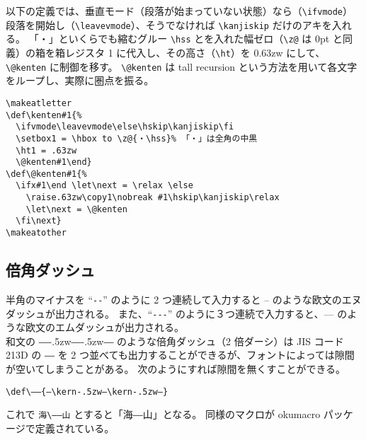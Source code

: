 以下の定義では、垂直モード（段落が始まっていない状態）なら（\verb`\ifvmode`）段落を開始し（\verb`\leavevmode`）、そうでなければ \verb`\kanjiskip` だけのアキを入れる。
「・」といくらでも縮むグルー \verb`\hss` とを入れた幅ゼロ（\verb`\z@` は 0pt と同義）の箱を箱レジスタ 1 に代入し、その高さ（\verb`\ht`）を 0.63zw にして、\verb`\@kenten` に制御を移す。
\verb`\@kenten` は tall recursion という方法を用いて各文字をループし、実際に圏点を振る。
\begin{mdframed}[roundcorner=0.50zw,leftmargin=3.00zw,rightmargin=3.00zw,skipabove=0.40zw,skipbelow=0.40zw,innertopmargin=4.00pt,innerbottommargin=4.00pt,innerleftmargin=5.00pt,innerrightmargin=5.00pt,linecolor=gray!020,linewidth=0.50pt,backgroundcolor=gray!20]
\begin{verbatim}
\makeatletter
\def\kenten#1{%
  \ifvmode\leavevmode\else\hskip\kanjiskip\fi
  \setbox1 = \hbox to \z@{・\hss}% 「・」は全角の中黒
  \ht1 = .63zw
  \@kenten#1\end}
\def\@kenten#1{%
  \ifx#1\end \let\next = \relax \else
    \raise.63zw\copy1\nobreak #1\hskip\kanjiskip\relax
    \let\next = \@kenten
  \fi\next}
\makeatother
\end{verbatim}
\end{mdframed}
\subsection{倍角ダッシュ}
半角のマイナスを ``\verb`--`'' のように 2 つ連続して入力すると {--} のような欧文のエヌダッシュが出力される。
また、``\verb`---`'' のように３つ連続で入力すると、--- のような欧文のエムダッシュが出力される。\\

和文の ―\kern-.5zw―\kern-.5zw― のような倍角ダッシュ（2 倍ダーシ）は JIS コード 213D の ― を 2 つ並べても出力することができるが、フォントによっては隙間が空いてしまうことがある。
次のようにすれば隙間を無くすことができる。
\begin{mdframed}[roundcorner=0.50zw,leftmargin=3.00zw,rightmargin=3.00zw,skipabove=0.40zw,skipbelow=0.40zw,innertopmargin=4.00pt,innerbottommargin=4.00pt,innerleftmargin=5.00pt,innerrightmargin=5.00pt,linecolor=gray!020,linewidth=0.50pt,backgroundcolor=gray!20]
\begin{verbatim}
\def\――{―\kern-.5zw―\kern-.5zw―}
\end{verbatim}
\end{mdframed}
これで \verb`海\――山` とすると「海\――山」となる。
同様のマクロが okumacro パッケージで定義されている。
